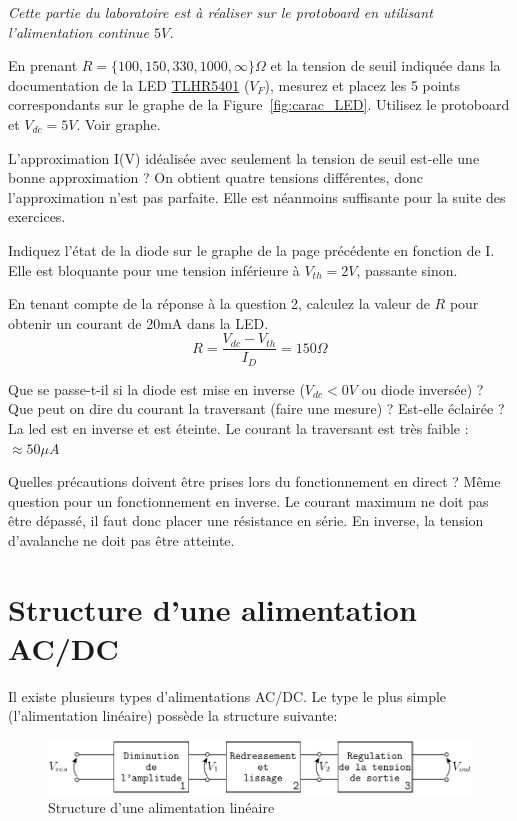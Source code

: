 \documentclass{../template/labo}
\begin{document}
	
\textit{Cette partie du laboratoire est à réaliser sur le protoboard en utilisant l'alimentation continue $5V$.}
	
\Question
{
	En prenant $R=\lbrace 100, 150, 330, 1000, \infty \rbrace \Omega$ et la tension de seuil indiquée dans la documentation de la LED \href{http://www.vishay.com/docs/83012/tlhg540.pdf}{TLHR5401} ($V_F$), mesurez et placez les 5 points correspondants sur le graphe de la Figure~\vref{fig:carac_LED}. Utilisez le protoboard et $V_{dc}=5V$.
}
{Voir graphe.}%
	\label{Q:1}

\Question
{
	L'approximation I(V) idéalisée avec seulement la tension de seuil est-elle une bonne approximation ?
}
{On obtient quatre tensions différentes, donc l'approximation n'est pas parfaite.
Elle est néanmoins suffisante pour la suite des exercices.}%
	\label{Q:2}

\Question
{
	Indiquez l'état de la diode sur le graphe de la page précédente en fonction de I.
}
{Elle est bloquante pour une tension inférieure à $V_{th} = 2 V$, passante sinon.}
	\label{Q:3}
	
\Question
{
	En tenant compte de la réponse à la question 2, calculez la valeur de $R$ pour obtenir un courant de 20mA dans la LED.	
}
{$$R=\frac{V_{dc}-V_{th}}{I_D}=150\Omega$$}%
	\label{Q:4}

\Question
{
	Que se passe-t-il si la diode est mise en inverse ($V_{dc}<0V$ ou diode inversée) ?  Que peut on dire du courant la traversant (faire une mesure) ? Est-elle éclairée ?
}
{La led est en inverse et est éteinte. Le courant la traversant est très faible : $\approx 50\mu A$ }%
	\label{Q:5}

\Question
{
	Quelles précautions doivent être prises lors du fonctionnement en direct ? Même question pour un fonctionnement en inverse.
}
{Le courant maximum ne doit pas être dépassé, il faut donc placer une résistance en série. En inverse, la tension d'avalanche ne doit pas être atteinte.}%
	\label{Q:6}


\section{Structure d'une alimentation AC/DC}
Il existe plusieurs types d'alimentations AC/DC. Le type le plus simple (l'alimentation linéaire) possède la structure suivante:

\begin{figure}[h!]
	\begin{center}
		\includegraphics[width=\linewidth]{figures/alim.pdf}
	\end{center}
\caption{Structure d'une alimentation linéaire}
\label{fig:alim}
\end{figure}
\end{document}
